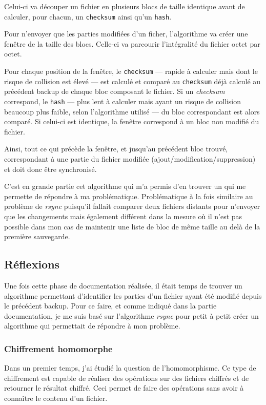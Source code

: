 \documentclass[a4paper,10pt, twoside]{report}
\begin{document}
\begin{spacing}{1.2}
Celui-ci va découper un fichier en plusieurs blocs de taille identique avant
de calculer, pour chacun, un \texttt{checksum} ainsi qu'un \texttt{hash}.

Pour n'envoyer que les parties modifiées d'un ficher, l'algorithme va créer
une fenêtre de la taille des blocs. Celle-ci va parcourir l'intégralité
du fichier octet par octet.

Pour chaque position de la fenêtre, le \texttt{checksum} --- rapide à
calculer mais dont le risque de collision est élevé --- est calculé et
comparé au \texttt{checksum} déjà calculé au précédent backup de
chaque bloc composant le fichier. Si un \textit{checksum} correspond, le
\texttt{hash} --- plus lent à calculer mais ayant un risque de collision
beaucoup plus faible, selon l'algorithme utilisé --- du bloc correspondant
est alors comparé. Si celui-ci est identique, la fenêtre correspond à un
bloc non modifié du fichier.

Ainsi, tout ce qui précède la fenêtre, et jusqu'au précédent bloc
trouvé, correspondant à une partie du fichier modifiée
(ajout/modification/suppression) et doit donc être synchronisé.

C'est en grande partie cet algorithme qui m'a permis d'en trouver un qui me
permette de répondre à ma problématique. Problématique à la fois
similaire au problème de \textit{rsync} puisqu'il fallait comparer deux
fichiers distants pour n'envoyer que les changements mais également
différent dans la mesure où il n'est pas possible dans mon cas de maintenir
une liste de bloc de même taille au delà de la première sauvegarde.

\subsection{Réflexions}

Une fois cette phase de documentation réalisée, il était temps de trouver
un algorithme permettant d'identifier les parties d'un fichier ayant été
modifié depuis le précédent backup. Pour ce faire, et comme indiqué
dans la partie documentation, je me suis basé sur l'algorithme \textit{rsync}
pour petit à petit créer un algorithme qui permettait de répondre à mon
problème.

\subsubsection{Chiffrement homomorphe}

Dans un premier temps, j'ai étudié la question de l'homomorphisme. Ce type
de chiffrement est capable de réaliser des opérations sur des fichiers chiffrés
et de retourner le résultat chiffré. Ceci permet de faire des opérations
sans avoir à connaître le contenu d'un fichier.


\end{spacing}
\end{document}

